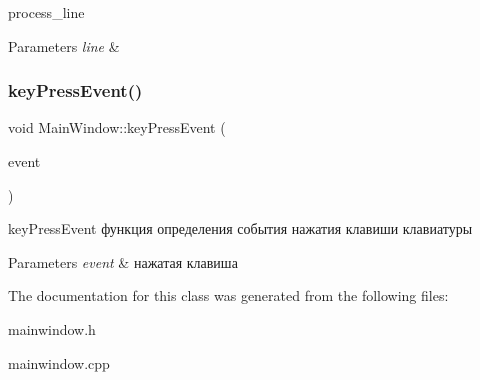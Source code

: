 process\+\_\+line 


\begin{DoxyParams}{Parameters}
{\em line} & \\
\hline
\end{DoxyParams}
\mbox{\label{class_main_window_a9c4f542263838b9ecd06eae839a42a34}} 
\subsubsection{\texorpdfstring{keyPressEvent()}{keyPressEvent()}}
{\footnotesize\ttfamily void Main\+Window\+::key\+Press\+Event (\begin{DoxyParamCaption}\item[{Q\+Key\+Event $\ast$}]{event }\end{DoxyParamCaption})}



key\+Press\+Event функция определения события нажатия клавиши клавиатуры 


\begin{DoxyParams}{Parameters}
{\em event} & нажатая клавиша \\
\hline
\end{DoxyParams}


The documentation for this class was generated from the following files\+:\begin{DoxyCompactItemize}
\item 
mainwindow.\+h\item 
mainwindow.\+cpp\end{DoxyCompactItemize}
